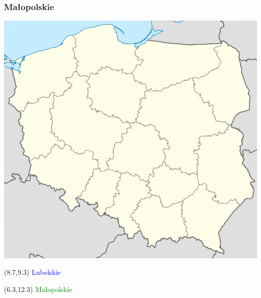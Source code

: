 \documentclass{beamer}
\begin{document}
\begin{frame}
\frametitle{Małopolskie}
\includegraphics[scale=0.25]{Polska}
\begin{textblock}{3}(8.7,9.3)
\textcolor{blue}{Lubelskie}
\end{textblock}
\begin{textblock}{3}(6.3,12.3)
\textcolor{green}{Małopolskie}
\end{textblock}
\end{frame}
\end{document}
